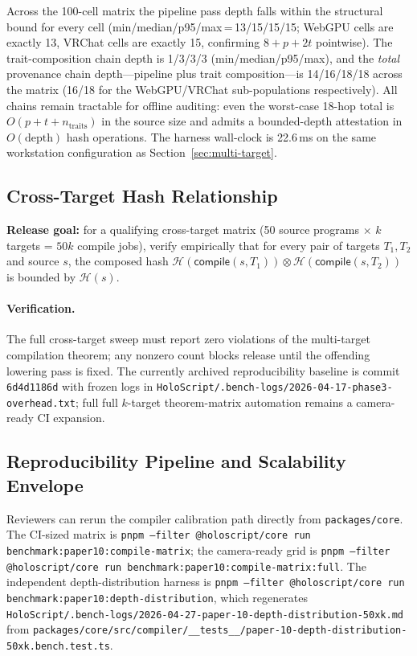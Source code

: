 \documentclass[sigconf,nonacm]{acmart}
\newcommand{\hashfn}{\mathcal{H}}
\newcommand{\tropmult}{\otimes}
\newcommand{\compilefn}{\mathsf{compile}}
\begin{document}
Across the 100-cell matrix the pipeline pass depth falls within the
structural bound for every cell (min/median/p95/max\,=\,13/15/15/15;
WebGPU cells are exactly 13, VRChat cells are exactly 15, confirming
$8{+}p{+}2t$ pointwise). The trait-composition chain depth is
1/3/3/3 (min/median/p95/max), and the \emph{total} provenance chain
depth---pipeline plus trait composition---is 14/16/18/18 across the
matrix (16/18 for the WebGPU/VRChat sub-populations respectively).
All chains remain tractable for offline auditing: even the
worst-case 18-hop total is $O(p{+}t{+}n_{\text{traits}})$ in the source
size and admits a bounded-depth attestation in $O(\text{depth})$ hash
operations. The harness wall-clock is 22.6\,ms on the same workstation
configuration as Section~\ref{sec:multi-target}.
\subsection{Cross-Target Hash Relationship}

\textbf{Release goal:} for a qualifying cross-target matrix (50 source programs
$\times$ $k$ targets = $50 k$ compile jobs), verify empirically that for every
pair of targets $T_1, T_2$ and source $s$, the composed hash
$\hashfn(\compilefn(s, T_1)) \tropmult \hashfn(\compilefn(s, T_2))$
is bounded by $\hashfn(s)$.

\paragraph{Verification.}
The full cross-target sweep must report zero violations of
the multi-target compilation theorem; any nonzero count blocks
release until the offending lowering pass is fixed. The currently archived
reproducibility baseline is commit \texttt{6d4d1186d} with frozen logs in
\texttt{HoloScript/.bench-logs/2026-04-17-phase3-overhead.txt}; full
full $k$-target theorem-matrix automation remains a camera-ready CI expansion.

\subsection{Reproducibility Pipeline and Scalability Envelope}
\label{sec:repro-scaling}

Reviewers can rerun the compiler calibration path directly from
\texttt{packages/core}. The CI-sized matrix is
\texttt{pnpm --filter @holoscript/core run benchmark:paper10:compile-matrix};
the camera-ready grid is
\texttt{pnpm --filter @holoscript/core run benchmark:paper10:compile-matrix:full}.
The independent depth-distribution harness is
\texttt{pnpm --filter @holoscript/core run benchmark:paper10:depth-distribution},
which regenerates
\texttt{HoloScript/.bench-logs/2026-04-27-paper-10-depth-distribution-50xk.md}
from \texttt{packages/core/src/compiler/\_\_tests\_\_/paper-10-depth-distribution-50xk.bench.test.ts}.
\end{document}
